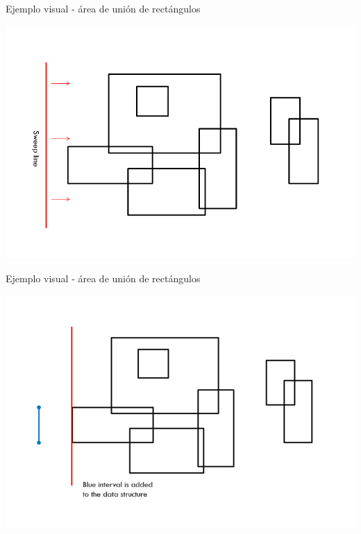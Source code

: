 \documentclass[compress]{beamer}
\begin{document}
\begin{frame}{Ejemplo visual - área de unión de rectángulos}
\begin{center}
\includegraphics[scale=0.4]{images/sweep_line_1.png}
\end{center}
\end{frame}

\begin{frame}{Ejemplo visual - área de unión de rectángulos}
\begin{center}
\includegraphics[scale=0.4]{images/sweep_line_2.png}
\end{center}
\end{frame}
\end{document}
